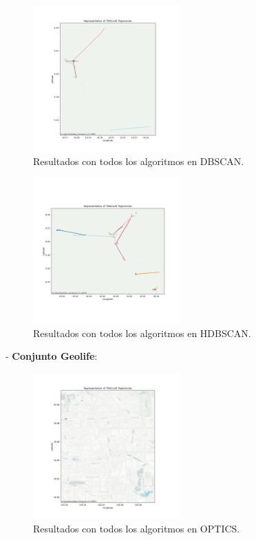 \FloatBarrier

\begin{figure}[h!]
    \centering
    \includegraphics[width=0.5\textwidth]{img/Movebank/map_dbscan_auto.png}
    \caption{Resultados con todos los algoritmos en DBSCAN.}
    \label{fig:movebank_algorith_dbscan}
\end{figure}

\FloatBarrier

\begin{figure}[h!]
    \centering
    \includegraphics[width=0.5\textwidth]{img/Movebank/map_hdbscan_auto.png}
    \caption{Resultados con todos los algoritmos en HDBSCAN.}
    \label{fig:movebank_algorith_hdbscan}
\end{figure}

\FloatBarrier

- \textbf{Conjunto Geolife}: 


\begin{figure}[h!]
    \centering
    \includegraphics[width=0.5\textwidth]{img/Geolife/map_optics_auto.png}
    \caption{Resultados con todos los algoritmos en OPTICS.}
    \label{fig:geolife_algorith_optics}
\end{figure}

